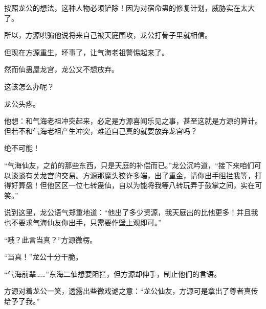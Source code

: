 \begin{this_body}
按照龙公的想法，这种人物必须铲除！因为对宿命蛊的修复计划，威胁实在太大了。

所以，方源哄骗他说将来自己被天庭围攻，龙公打骨子里就相信。

但现在方源重生，坏事了，让气海老祖警惕起来了。

然而仙蛊屋龙宫，龙公又不想放弃。

这该怎么办呢？

龙公头疼。

他想：和气海老祖冲突起来，必定是方源喜闻乐见之事，甚至这就是方源的算计。但若不和气海老祖产生冲突，难道自己真的就要放弃龙宫吗？

绝不可能！

“气海仙友，之前的那些东西，只是天庭的补偿而已。”龙公沉吟道，“接下来咱们可以谈谈有关龙宫的交易。方源那魔头狡诈多端，出了重金，请你出手阻拦我等，打得好算盘！但他区区一位七转蛊仙，自以为能将我等八转玩弄于鼓掌之间，实在可笑。”

说到这里，龙公语气郑重地道：“他出了多少资源，我天庭出的比他更多！并且我也不要求气海仙友你出手，只需要作壁上观即可。”

“哦？此言当真？”方源微楞。

“当真！”龙公十分干脆。

“气海前辈……”东海二仙想要阻拦，但方源却伸手，制止他们的言语。

方源对着龙公一笑，透露出些微戏谑之意：“龙公仙友，方源可是拿出了尊者真传给予了我。”

\end{this_body}

